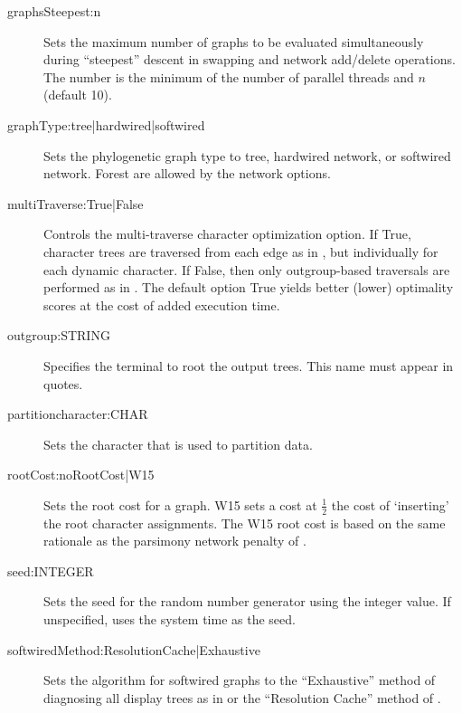 \begin{description}
			\item[graphsSteepest:n] Sets the maximum number of graphs to be evaluated 
			simultaneously during ``steepest'' descent in swapping and network add/delete operations. 
			The number is the minimum of the number of parallel threads and $n$ (default 10).
			
			\item[graphType:tree|hardwired|softwired] Sets the phylogenetic graph type to tree, 
			hardwired network, or softwired network. Forest are allowed by the network options.
			
			
			\item[multiTraverse:True|False] Controls the multi-traverse character optimization option. 
			If True, character trees are traversed from each edge as in 
			\citep{VaronandWheeler2012,VaronandWheeler2013, POY4, POY5}, but individually for 
			each dynamic character. If False, then only outgroup-based traversals are performed as in 
			\citep{Wheeler1996, POY2, POY3}.  	The default option True yields better (lower) optimality 
			scores at the cost of added execution time.
			
			\item[outgroup:STRING] Specifies the terminal to root the output trees. 
			This name must appear in quotes. 
			
			\item[partitioncharacter:CHAR] Sets the character that is used to partition data. 
			
			\item[rootCost:noRootCost|W15] 
			Sets the root cost for a graph. W15 sets a 
			cost at $\frac{1}{2}$ the cost of `inserting' the root character assignments. 
			The W15 root cost is based on the same rationale as the parsimony network penalty of
			 \cite{Wheeler2015}.
			 
			 \item[seed:INTEGER] Sets the seed for the random number generator using the integer
			 value. If unspecified, \phyg uses the system time as the seed.
			 
			 \item[softwiredMethod:ResolutionCache|Exhaustive] Sets the algorithm for softwired graphs 
			 to the ``Exhaustive'' method of diagnosing all display trees as in \cite{Wheeler2015} or
			 the ``Resolution Cache'' method of \cite{WheelerandWashburn2023}.  
			 
		\end{description}
					
